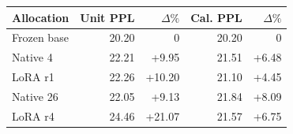 \begin{tabular}{@{}lrrrr@{}}
\toprule
Allocation & Unit PPL & $\Delta\%$ & Cal. PPL & $\Delta\%$\\
\midrule
Frozen base & 20.20 & 0 & 20.20 & 0\\
Native 4 & 22.21 & +9.95 & 21.51 & +6.48\\
LoRA r1 & 22.26 & +10.20 & 21.10 & +4.45\\
Native 26 & 22.05 & +9.13 & 21.84 & +8.09\\
LoRA r4 & 24.46 & +21.07 & 21.57 & +6.75\\
\bottomrule
\end{tabular}
